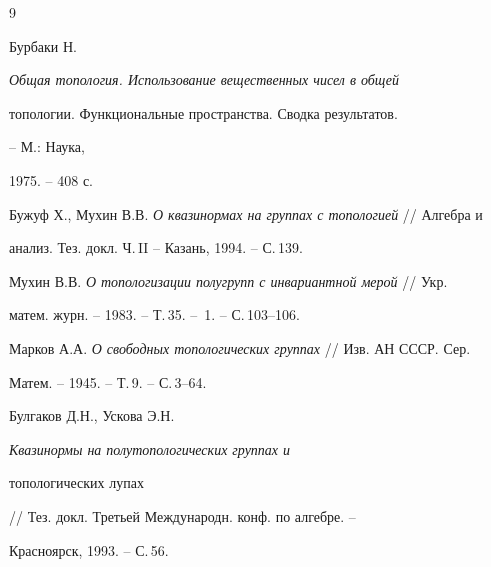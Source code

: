 \begin{thebibliography}{9} 


 




Бурбаки Н. {\em Общая топология. Использование вещественных чисел в общей 


топологии. Функциональные пространства. Сводка результатов.} -- М.: Наука, 


1975. -- 408 с. 


 




Бужуф Х., Мухин В.В. {\em О квазинормах на группах с топологией} // Алгебра и 


анализ. Тез. докл. Ч.\,II -- Казань, 1994. -- С.\,139. 


 




Мухин В.В. {\em О топологизации полугрупп с инвариантной мерой} // Укр. 


матем. журн. -- 1983. -- Т.\,35. -- \No\,1. -- С.\,103--106. 


 




Марков А.А. {\em О свободных топологических группах} // Изв. АН СССР. Сер. 


Матем. -- 1945. -- Т.\,9. -- С.\,3--64. 


 




Булгаков Д.Н., Ускова Э.Н. {\em Квазинормы на полутопологических группах и 


топологических лупах} // Тез. докл. Третьей Международн. конф. по алгебре. -- 


Красноярск, 1993. -- С.\,56. 


 


\end{thebibliography} 


 


\vskip 2cm 


 






 


 



